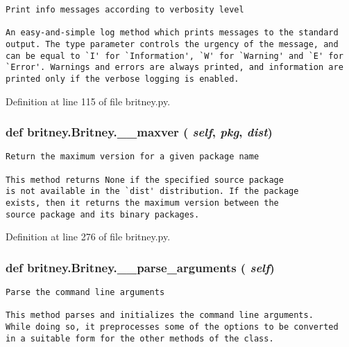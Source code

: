 \footnotesize\begin{verbatim}Print info messages according to verbosity level

An easy-and-simple log method which prints messages to the standard
output. The type parameter controls the urgency of the message, and
can be equal to `I' for `Information', `W' for `Warning' and `E' for
`Error'. Warnings and errors are always printed, and information are
printed only if the verbose logging is enabled.
\end{verbatim}
\normalsize
 

Definition at line 115 of file britney.py.
\subsubsection{\setlength{\rightskip}{0pt plus 5cm}def britney.Britney.\_\-\_\-maxver ( {\em self},  {\em pkg},  {\em dist})}\label{classbritney_1_1Britney_0affb1945986a52c61a4492c9732968e}




\footnotesize\begin{verbatim}Return the maximum version for a given package name

This method returns None if the specified source package
is not available in the `dist' distribution. If the package
exists, then it returns the maximum version between the
source package and its binary packages.
\end{verbatim}
\normalsize
 

Definition at line 276 of file britney.py.
\subsubsection{\setlength{\rightskip}{0pt plus 5cm}def britney.Britney.\_\-\_\-parse\_\-arguments ( {\em self})}\label{classbritney_1_1Britney_506f9800068902cf7cac6236b78d1dc4}




\footnotesize\begin{verbatim}Parse the command line arguments

This method parses and initializes the command line arguments.
While doing so, it preprocesses some of the options to be converted
in a suitable form for the other methods of the class.
\end{verbatim}
\normalsize
 

